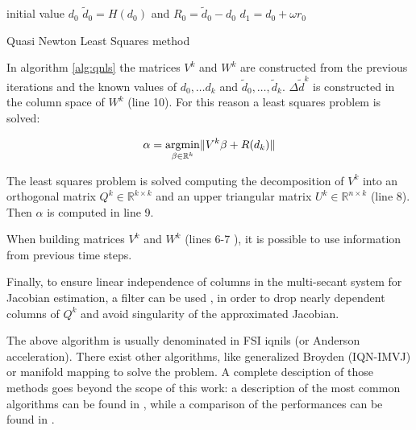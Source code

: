 \begin{algorithm}[H]
	\SetAlgoLined
	initial value $d_0$\;
	$\tilde{d}_0 = H(d_0)$ and $R_0 = \tilde{d}_0 - d_0$\;
	$d_1 = d_0 + \omega r_0$\;
	\label{alg:qnls}
	\caption{Quasi Newton Least Squares method}
\end{algorithm}

In algorithm \ref{alg:qnls} the matrices $V^k$ and $W^k$ are constructed from the previous iterations and the known values of $d_0, \ldots d_k$ and $\tilde{d}_0, \ldots, \tilde{d}_k$. $\Delta \tilde{d}^k$ is constructed in the column space of $W^k$ (line 10). For this reason a least squares problem is solved:

\begin{equation}
	\alpha = \operatorname*{argmin}_{\beta \in \mathbb{R}^k} \lVert V^k\beta + R(d_k) \rVert
\end{equation}

The least squares problem is solved  computing the decomposition of $V^k$ into an orthogonal matrix $Q^k \in \mathbb{R}^{k \times k} $ and an upper triangular matrix $U^k \in \mathbb{R}^{n \times k}$ (line 8). Then $\alpha$ is computed in line 9.

When building matrices $V^k$ and $W^k$ (lines 6-7 ), it is possible to use information from previous time steps.

Finally, to ensure linear independence of columns in the multi-secant system for Jacobian estimation, a filter can be used \cite{haelterman2016improving}, in order to drop nearly dependent columns of $Q^k$ and avoid singularity of the approximated Jacobian.

The above algorithm is usually denominated in FSI  \acrfull{iqnils} (or Anderson acceleration). There exist other algorithms, like generalized Broyden (IQN-IMVJ) or manifold mapping to solve the problem. A complete desciption of those methods goes beyond the scope of this work: a description of the most common algorithms can be found in \cite{blom2016review}, while a comparison of the performances can be found in \cite{lindner2015comparison}.


